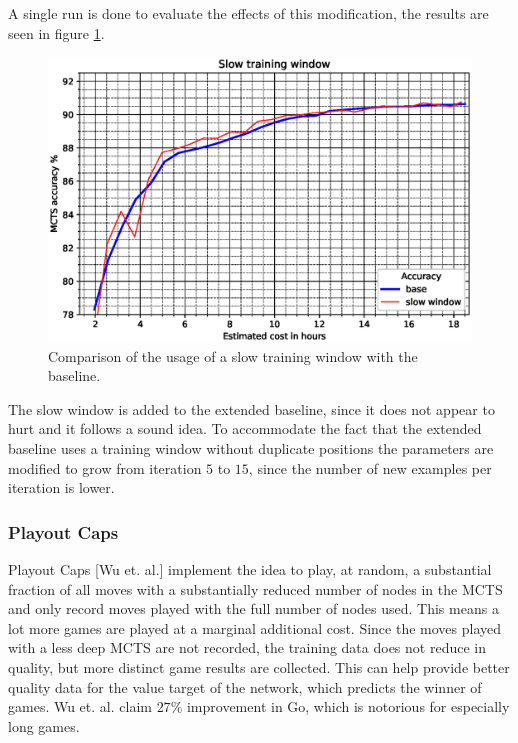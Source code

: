 \documentclass[12pt,onecolumn,oneside,titlepage]{article}
\begin{document}
A single run is done to evaluate the effects of this modification, the results are seen in figure \ref{fig:slow_window_results}. 

\begin{figure}[H]
\centering
\includegraphics[clip,width=\columnwidth]{slow_window}
\caption{Comparison of the usage of a slow training window with the baseline.}
\label{fig:slow_window_results}
\end{figure}

The slow window is added to the extended baseline, since it does not appear to hurt and it follows a sound idea. To accommodate the fact that the extended baseline uses a training window without duplicate positions the parameters are modified
to grow from iteration $5$ to $15$, since the number of new examples per iteration is lower.

\subsubsection{Playout Caps}

Playout Caps \cite{wu2019accelerating}[Wu et. al.] implement the idea to play, at random, a substantial fraction of all moves with a substantially reduced number of nodes in the MCTS and only record moves played with the full number of nodes used.
This means a lot more games are played at a marginal additional cost. Since the moves played with a less deep MCTS are not recorded, the training data does not reduce in quality, but more distinct game results are collected.
This can help provide better quality data for the value target of the network, which predicts the winner of games. Wu et. al. claim $27\%$ improvement in Go, which is notorious for especially long games.
\end{document}
